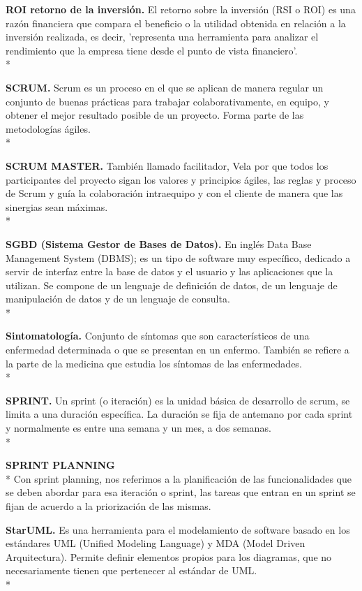 \documentclass[../pfc.tex]{subfiles}
\begin{document}
	\textbf{ROI retorno de la inversión.}
	El retorno sobre la inversión (RSI o ROI) es una razón financiera que compara el beneficio o la utilidad obtenida en relación a la inversión realizada, es decir, 'representa una herramienta para analizar el rendimiento que la empresa tiene desde el punto de vista financiero'.\\*	
	
	\textbf{SCRUM.}
	Scrum es un proceso en el que se aplican de manera regular un conjunto de buenas prácticas para trabajar colaborativamente, en equipo, y obtener el mejor resultado posible de un proyecto. Forma parte de las metodologías ágiles.\\*
		
	\textbf{SCRUM MASTER.}	
	También llamado facilitador, Vela por que todos los participantes del proyecto sigan los valores y principios ágiles, las reglas y proceso de Scrum y guía la colaboración intraequipo y con el cliente de manera que las sinergias sean máximas.\\* 
	
	\textbf{SGBD (Sistema Gestor de Bases de Datos).}
	En inglés Data Base Management System (DBMS); es un tipo de software muy específico, dedicado a servir de interfaz entre la base de datos y el usuario y las aplicaciones que la utilizan. Se compone de un lenguaje de definición de datos, de un lenguaje de manipulación de datos y de un lenguaje de consulta.\\*
	
	\textbf{Sintomatología.}
	Conjunto de síntomas que son característicos de una enfermedad determinada o que se presentan en un enfermo.
	También se refiere a la parte de la medicina que estudia los síntomas de las enfermedades.\\*
	
	\textbf{SPRINT.}
	Un sprint (o iteración) es la unidad básica de desarrollo de scrum, se limita a una duración específica.
	La duración se fija de antemano por cada sprint y normalmente es entre una semana y un mes, a dos semanas.\\*
	
	\textbf{SPRINT PLANNING}\\*
	Con sprint planning, nos referimos a la planificación de las funcionalidades que se deben abordar para esa iteración o sprint, las tareas que entran en un sprint se fijan de acuerdo a la priorización de las mismas. 
	
	\textbf{StarUML.}
	Es una herramienta para el modelamiento de software basado en los estándares UML (Unified Modeling Language) y MDA (Model Driven Arquitectura). Permite definir elementos propios para los diagramas, que no necesariamente tienen que pertenecer al estándar de UML.\\*
	
\end{document}
